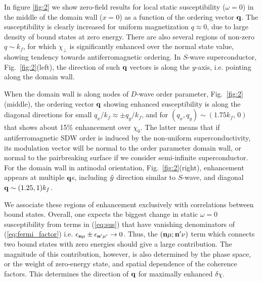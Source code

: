 \documentclass[prb,aps,showpacs,amsmath,twocolumn,10pt]{revtex4-1}
\begin{document}
In figure \ref{fig:2} we show zero-field results for local static
susceptibility ($\omega=0$) in the middle of the domain wall ($x=0$) 
as a function of the ordering vector ${\bf q}$. 
The susceptibility is clearly increased for uniform magnetization $q\approx0$,
due to large density of bound states at zero energy. There are also several
regions of non-zero $q \sim k_f$, for which $\chi_\perp$ is significantly
enhanced over the normal state value, showing tendency towards
antiferromagnetic ordering.  In $S$-wave superconductor,
Fig.~\ref{fig:2}(left), the direction of such ${\bf q}$ vectors is along the
$y$-axis, i.e. pointing along the domain wall.
%

When the domain wall is along nodes of $D$-wave order parameter,
Fig.~\ref{fig:2}(middle), the ordering vector ${\bf q}$ showing enhanced
susceptibility is along the diagonal directions for small $q_x/k_f \approx \pm
q_y/k_f$, and for $(q_x, q_y) \sim (1.75 k_f,\, 0)$ that shows about 15\% enhancement over
$\chi_0$.  The latter means that if antiferromagnetic SDW order is induced by
the non-uniform superconductivity, its modulation vector will be normal to the
order parameter domain wall, or normal to the pairbreaking surface if we
consider semi-infinite superconductor. For the domain wall in antinodal orientation, 
Fig.~\ref{fig:2}(right), enhancement appears at multiple ${\bf q}$s, including 
$\hat{y}$ direction similar to $S$-wave, and diagonal ${\bf q}\sim(1.25,1)k_f$. 

We associate these regions of enhancement exclusively with correlations between bound states. 
Overall, one expects the biggest change in static $\omega=0$ susceptibility from terms in 
(\ref{eq:sus}) that have vanishing denominators of (\ref{eq:fermi_factor}) i.e.  
$\epsilon_{{\bf n}\mu}\pm\epsilon_{{\bf n}'\mu'} \to 0 $. 
Thus, the $({\bf n}\mu;{\bf n}'\nu)$ term
which connects two bound states with zero energies should give a large contribution. 
The magnitude of this contribution, however, is also determined by the phase space, 
or the weight of zero-energy state,
and spatial dependence of the coherence factors. 
This determines the direction of ${\bf q}$ for maximally enhanced $\delta \chi$.
\end{document}
